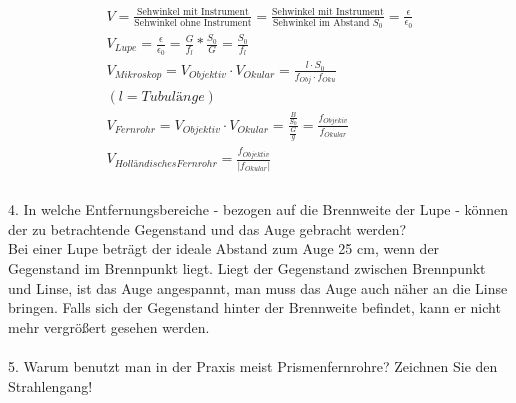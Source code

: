 \begin{align*}
V=\frac{\text{Sehwinkel mit Instrument}}{\text{Sehwinkel ohne Instrument}}=
\frac{\text{Sehwinkel mit Instrument}}{\text{Sehwinkel im Abstand $S_0$}}=
\frac{\epsilon}{\epsilon_0} \\
V_{Lupe}=\frac{\epsilon}{\epsilon_0}=\frac{G}{f_l}*\frac{S_0}{G}=\frac{S_0}{f_l} \\
V_{Mikroskop}=V_{Objektiv} \cdot V_{Okular}=\frac{l \cdot S_0}{f_{Obj} \cdot f_{Oku}}\\ (l=Tubulänge)\\
V_{Fernrohr}= V_{Objektiv} \cdot V_{Okular}= \frac{\frac{B}{S_0}}{\frac{G}{g}}=\frac{f_{Objekiv}}{f_{Okular}}\\
V_{Holländisches Fernrohr}=\frac{f_{Objektiv}}{|f_{Okular}|}\\
\end{align*}
\\4. In welche Entfernungsbereiche - bezogen auf die Brennweite der Lupe - können der zu betrachtende Gegenstand und das Auge gebracht werden?\\
Bei einer Lupe beträgt der ideale Abstand zum Auge 25 cm, wenn der Gegenstand im Brennpunkt liegt. Liegt der Gegenstand zwischen Brennpunkt und Linse, ist das Auge angespannt, man muss das Auge auch näher an die Linse bringen. Falls sich der Gegenstand hinter der Brennweite befindet, kann er nicht mehr vergrößert gesehen werden.\\
\\5. Warum benutzt man in der Praxis meist Prismenfernrohre? Zeichnen Sie den Strahlengang!\\
\begin{figure}[h]
 \centering
\end{figure}
